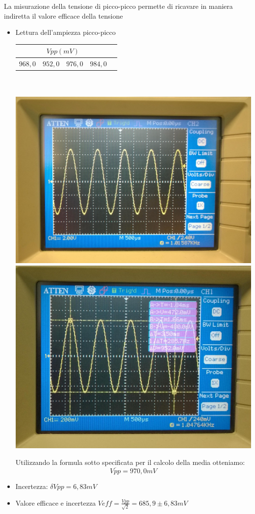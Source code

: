 \documentclass[a4paper]{article}
\begin{document}
La misurazione della tensione di picco-picco permette di ricavare in maniera indiretta il valore efficace della tensione
\begin{itemize}
\item Lettura dell’ampiezza picco-picco \\ 
    \begin{tabular}{|r|l|l|l|l|}
     \hline
     \multicolumn{4}{|c|}{\(Vpp (mV)\)} \\
     \hline
     \(968,0\) & \(952,0\) & \(976,0\) & \(984,0\) \\
     \hline
   \end{tabular} \\ \\

\centering
    \includegraphics[scale=0.1]{foto/WP_20141009_003.jpg}
  \endminipage
    \includegraphics[scale=0.14]{foto/WP_20141009_004.jpg}
  \endminipage

\justify
\newpage

Utilizzando la formula sotto specificata per il calcolo della media otteniamo:
\[\overline{Vpp}= 970,0 mV\]
\item Incertezza: \(\delta{}  Vpp= 6,83 mV\)
\item Valore efficace e incertezza \(Veff= \tfrac{Vpp}{\sqrt{2}} = 685,9 \pm 6,83 mV \)
\end{itemize}
\end{document}
